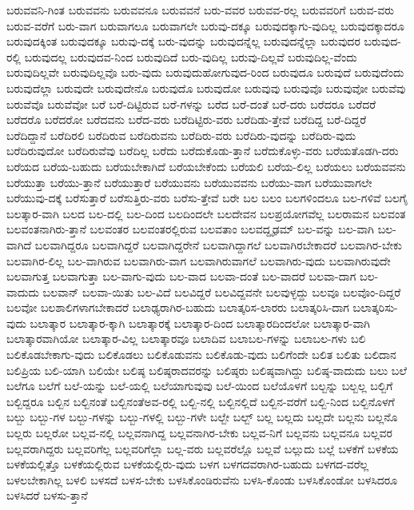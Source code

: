 {ಬರುವವನಿ-ಗಿಂತ
ಬರುವವನು
ಬರುವವನೂ
ಬರುವವನೆ
ಬರು-ವವರ
ಬರುವವ-ರಲ್ಲ
ಬರುವವರಿಗೆ
ಬರುವ-ವರು
ಬರುವ-ವರೆಗೆ
ಬರು-ವಾಗ
ಬರುವಾಗಲೂ
ಬರುವಾಗಲೇ
ಬರುವು-ದಕ್ಕೂ
ಬರುವುದಕ್ಕಾಗು-ವುದಿಲ್ಲ
ಬರುವುದಕ್ಕಾದರೂ
ಬರುವುದಕ್ಕಿಂತ
ಬರುವುದಕ್ಕೂ
ಬರುವು-ದಕ್ಕೆ
ಬರು-ವುದನ್ನು
ಬರುವುದನ್ನೆಲ್ಲ
ಬರುವುದನ್ನೆಲ್ಲಾ
ಬರುವುದರ
ಬರುವುದ-ರಲ್ಲಿ
ಬರುವುದಲ್ಲ
ಬರುವುದವ-ನಿಂದ
ಬರುವುದಿದೆ
ಬರು-ವುದಿಲ್ಲ
ಬರುವು-ದಿಲ್ಲವೆ
ಬರುವುದಿಲ್ಲ-ವೆಂದು
ಬರುವುದಿಲ್ಲವೇ
ಬರುವುದಿಲ್ಲವೊ
ಬರು-ವುದು
ಬರುವುದುಹೋಗುವುದ-ರಿಂದ
ಬರುವುದೂ
ಬರುವುದೆ
ಬರುವುದೆಂದು
ಬರುವುದೆಲ್ಲಾ
ಬರುವುದೇ
ಬರುವುದೇನೊ
ಬರುವುದೊ
ಬರುವುದೋ
ಬರುವುವು
ಬರುವುವೊ
ಬರುವುವೋ
ಬರುವೆವು
ಬರುವೆವೊ
ಬರುವೆವೋ
ಬರೆ
ಬರೆ-ದಿಟ್ಟಿರುವ
ಬರೆ-ಗಳನ್ನು
ಬರೆದ
ಬರೆ-ದಂತೆ
ಬರೆ-ದರು
ಬರೆದರೂ
ಬರೆದರೆ
ಬರೆದರೊ
ಬರೆದರೋ
ಬರೆದವನು
ಬರೆದ-ವರು
ಬರೆದಿಟ್ಟಿರು-ವರು
ಬರೆದಿಡು-ತ್ತೇವೆ
ಬರೆದಿದ್ದ
ಬರೆ-ದಿದ್ದರೆ
ಬರೆದಿದ್ದಾನೆ
ಬರೆದಿರಲಿ
ಬರೆದಿರುವ
ಬರೆದಿರುವನು
ಬರೆದಿರು-ವರು
ಬರೆದಿರು-ವುದನ್ನು
ಬರೆದಿರು-ವುದು
ಬರೆದಿರುವುದೋ
ಬರೆದಿರುವೆವು
ಬರೆದಿಲ್ಲ
ಬರೆದು
ಬರೆದುಕೊಡು-ತ್ತಾನೆ
ಬರೆದುಕೊಳ್ಳು-ವರು
ಬರೆಯತೊಡಗಿ-ದರು
ಬರೆಯದ
ಬರೆಯ-ಬಹುದು
ಬರೆಯಬೇಕಾಗಿದೆ
ಬರೆಯಬೇಕೆಂದು
ಬರೆಯಲಿ
ಬರೆಯ-ಲಿಲ್ಲ
ಬರೆಯಲು
ಬರೆಯವವನು
ಬರೆಯುತ್ತಾ
ಬರೆಯು-ತ್ತಾನೆ
ಬರೆಯುತ್ತಾರೆ
ಬರೆಯುವನು
ಬರೆಯುವವನು
ಬರೆಯು-ವಾಗ
ಬರೆಯುವಾಗಲೇ
ಬರೆಯುವು-ದಕ್ಕೆ
ಬರೆಸುತ್ತಾರೆ
ಬರೆಸುತ್ತಿರು-ವರು
ಬರೆಸು-ತ್ತೇವೆ
ಬರೇ
ಬಲ
ಬಲಂ
ಬಲಗಳಿಂದಲೂ
ಬಲ-ಗಳಿವೆ
ಬಲಗೈ
ಬಲತ್ಕಾರ-ವಾಗಿ
ಬಲದ
ಬಲ-ದಲ್ಲಿ
ಬಲ-ದಿಂದ
ಬಲದಿಂದಲೇ
ಬಲದೇವನ
ಬಲಪ್ರಯೋಗವೆಲ್ಲ
ಬಲರಾಮನ
ಬಲವಂತ
ಬಲವಂತನಾಗಿರು-ತ್ತಾನೆ
ಬಲವಂತರ
ಬಲವಂತರಲ್ಲಿರುವ
ಬಲವತಾಂ
ಬಲವದ್ದೃಢಮ್
ಬಲ-ವನ್ನು
ಬಲ-ವಾಗಿ
ಬಲ-ವಾಗಿದೆ
ಬಲವಾಗಿದ್ದರೂ
ಬಲವಾಗಿದ್ದರೆ
ಬಲವಾಗಿದ್ದರೇನೆ
ಬಲವಾಗಿದ್ದಾಗಲೆ
ಬಲವಾಗಿರಬೇಕಾದರೆ
ಬಲವಾಗಿರ-ಬೇಕು
ಬಲವಾಗಿರ-ಲಿಲ್ಲ
ಬಲ-ವಾಗಿರುವ
ಬಲವಾಗಿರು-ವಾಗ
ಬಲವಾಗಿರುವಾಗಲೆ
ಬಲವಾಗಿರು-ವುದು
ಬಲವಾಗಿರುವುದೇ
ಬಲವಾಗುತ್ತ
ಬಲವಾಗುತ್ತಾ
ಬಲ-ವಾಗು-ವುದು
ಬಲ-ವಾದ
ಬಲವಾ-ದಂತೆ
ಬಲ-ವಾದರೆ
ಬಲವಾ-ದಾಗ
ಬಲ-ವಾದುದು
ಬಲವಾನ್
ಬಲವಾ-ಯಿತು
ಬಲ-ವಿದೆ
ಬಲವಿದ್ದರೆ
ಬಲವಿದ್ದವನೇ
ಬಲವುಳ್ಳದ್ದು
ಬಲವೂ
ಬಲವೊಂ-ದಿದ್ದರೆ
ಬಲವೋ
ಬಲಶಾಲಿಗಳಾಗಬೇಕಾದರೆ
ಬಲಾಢ್ಯರಾಗಿರ-ಬಹುದು
ಬಲಾತ್ಕರಿಸ-ಲಾರರು
ಬಲಾತ್ಕರಿಸಿ-ದಾಗ
ಬಲಾತ್ಕರಿಸು-ವುದು
ಬಲಾತ್ಕಾರ
ಬಲಾತ್ಕಾರ-ಕ್ಕಾಗಿ
ಬಲಾತ್ಕಾರಕ್ಕೆ
ಬಲಾತ್ಕಾರ-ದಿಂದ
ಬಲಾತ್ಕಾರದಿಂದಲೋ
ಬಲಾತ್ಕಾರ-ವಾಗಿ
ಬಲಾತ್ಕಾರವಾಗಿಯೋ
ಬಲಾತ್ಕಾರ-ವಿಲ್ಲ
ಬಲಾತ್ಕಾರವೂ
ಬಲಾದಿವ
ಬಲಾಬಲ-ಗಳನ್ನು
ಬಲಾಬಲ-ಗಳು
ಬಲಿ
ಬಲಿಕೊಡಬೇಕಾಗು-ವುದು
ಬಲಿಕೊಡಲು
ಬಲಿಕೊಡುವನು
ಬಲಿಕೊಡು-ವುದು
ಬಲಿಗೆಂದೇ
ಬಲಿತ
ಬಲಿತು
ಬಲಿದಾನ
ಬಲಿಪ್ರಿಯ
ಬಲಿ-ಯಾಗಿ
ಬಲಿಯೇ
ಬಲಿಷ್ಠ
ಬಲಿಷ್ಠರಾದವರನ್ನು
ಬಲಿಷ್ಠರು
ಬಲಿಷ್ಠವಾಗಿದ್ದು
ಬಲಿಷ್ಠ-ವಾದುದು
ಬಲು
ಬಲೆ
ಬಲೆಗೂ
ಬಲೆಗೆ
ಬಲೆ-ಯನ್ನು
ಬಲೆ-ಯಲ್ಲಿ
ಬಲೆಯಾಗುವುವು
ಬಲೆ-ಯಿಂದ
ಬಲೆಯೊಳಗೆ
ಬಲ್ಬನ್ನು
ಬಲ್ಬಲ್ಲ
ಬಲ್ಬಿಗೆ
ಬಲ್ಬಿದ್ದರೂ
ಬಲ್ಬಿನ
ಬಲ್ಬಿನಂತೆ
ಬಲ್ಬಿನಂತೆಅವ-ರಲ್ಲಿ
ಬಲ್ಬಿ-ನಲ್ಲಿ
ಬಲ್ಬಿನಲ್ಲಿದೆ
ಬಲ್ಬಿನ-ವರೆಗೆ
ಬಲ್ಬಿ-ನಿಂದ
ಬಲ್ಬಿನೊಳಗೆ
ಬಲ್ಬು
ಬಲ್ಬು-ಗಳ
ಬಲ್ಬು-ಗಳನ್ನು
ಬಲ್ಬು-ಗಳಲ್ಲಿ
ಬಲ್ಬು-ಗಳೇ
ಬಲ್ಬೇ
ಬಲ್ಬ್
ಬಲ್ಲ
ಬಲ್ಲದು
ಬಲ್ಲದೇ
ಬಲ್ಲನು
ಬಲ್ಲನೊ
ಬಲ್ಲರು
ಬಲ್ಲರೋ
ಬಲ್ಲವ-ನಲ್ಲಿ
ಬಲ್ಲವನಾಗಿದ್ದ
ಬಲ್ಲವನಾಗಿರ-ಬೇಕು
ಬಲ್ಲವ-ನಿಗೆ
ಬಲ್ಲವನು
ಬಲ್ಲವನೂ
ಬಲ್ಲವರ
ಬಲ್ಲವರಾಗಿದ್ದರು
ಬಲ್ಲವರಿಗೆಲ್ಲ
ಬಲ್ಲವರಿಗೆಲ್ಲಾ
ಬಲ್ಲ-ವರು
ಬಲ್ಲವರೆಲ್ಲೊ
ಬಲ್ಲವೆ
ಬಲ್ಲುದು
ಬಲ್ಲೆ
ಬಳಕೆಗೆ
ಬಳಕೆಯ
ಬಳಕೆಯಲ್ಲಿತ್ತೊ
ಬಳಕೆಯಲ್ಲಿರುವ
ಬಳಕೆಯಲ್ಲಿರು-ವುದು
ಬಳಗ
ಬಳಗದವರಾಗಿರ-ಬಹುದು
ಬಳಗದ-ವರೆಲ್ಲ
ಬಳಲಬೇಕಾಗಿಲ್ಲ
ಬಳಲಿ
ಬಳಸದೆ
ಬಳಸ-ಬೇಕು
ಬಳಸಿಕೊಂಡಿರುವೆನು
ಬಳಸಿ-ಕೊಂಡು
ಬಳಸಿಕೊಂಡೋ
ಬಳಸಿದರೂ
ಬಳಸಿದರೆ
ಬಳಸು-ತ್ತಾನೆ
}
